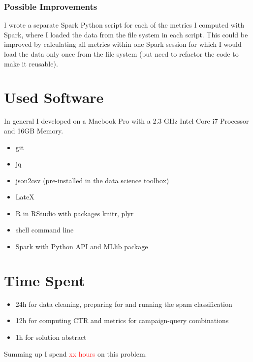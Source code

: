 \documentclass{article}\usepackage[]{graphicx}\usepackage[]{color}
\begin{document}
\subsubsection{Possible Improvements} %
\label{subsub:improvements}

I wrote a separate Spark Python script for each of the metrics I computed with Spark, where I loaded the data from the file system in each script. This could be improved by calculating all metrics within one Spark session for which I would load the data only once from the file system (but need to refactor the code to make it reusable). 




\section{Used Software}
\label{used_software}
In general I developed on a Macbook Pro with a 2.3 GHz Intel Core i7 Processor and 16GB Memory.

\begin{itemize}
	\item git
	\item jq
	\item json2csv (pre-installed in the data science toolbox)
	\item LateX
	\item R in RStudio with packages knitr, plyr
	\item shell command line
	\item Spark with Python API and MLlib package
\end{itemize}

\section{Time Spent}
\begin{itemize}
	\item 24h for data cleaning, preparing for and running the spam classification
	\item 12h for computing CTR and metrics for campaign-query combinations
	\item 1h for solution abstract
\end{itemize}

Summing up I spend \textcolor{red}{xx hours} on this problem.
\end{document}
